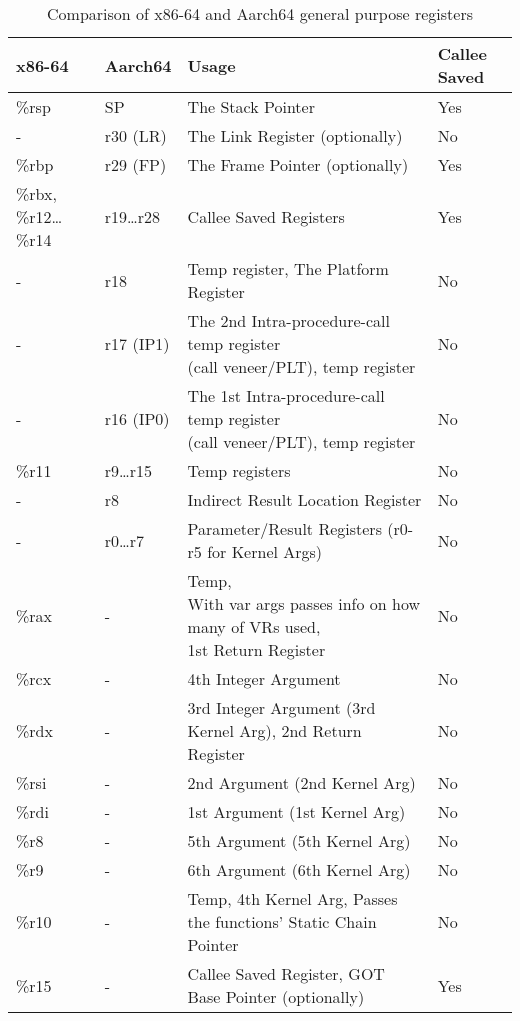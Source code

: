 \documentclass[11pt]{article}
\begin{document}
\begin{table}[ht]
\caption{Comparison of x86-64 and Aarch64 general purpose registers}
\begin{adjustwidth}{-4cm}{-4cm}
\begin{tabular}{|l|l|l|l|}
    \hline
    \textbf{x86-64} & \textbf{Aarch64} & \textbf{Usage} & \textbf{Callee Saved} \\
    \hline
    \%rsp & SP & The Stack Pointer & Yes \\
    \hline
    - & r30 (LR) & The Link Register (optionally) & No \\
    \hline
    \%rbp & r29 (FP) & The Frame Pointer (optionally) & Yes \\
    \hline
    \%rbx, \%r12\ldots \%r14 & r19\ldots r28 & Callee Saved Registers & Yes \\
    \hline
    - & r18 & Temp register, The Platform Register & No \\
    \hline
    - & r17 (IP1) & \pbox{20cm}{The 2nd Intra-procedure-call temp register \\ (call veneer/PLT), temp register} & No \\
    \hline
    - & r16 (IP0) & \pbox{20cm}{The 1st Intra-procedure-call temp register \\ (call veneer/PLT), temp register} & No \\
    \hline
    \%r11 & r9\ldots r15 & Temp registers & No \\
    \hline
    - & r8 & Indirect Result Location Register & No \\
    \hline
    - & r0\ldots r7 & Parameter/Result Registers (r0-r5 for Kernel Args) & No \\
    \hline
    \%rax & - & \pbox{20cm}{Temp, \\  With var args passes info on how many of VRs used, \\ 1st Return Register} & No \\
    \hline
    \%rcx & - & 4th Integer Argument & No \\
    \hline
    \%rdx & - & 3rd Integer Argument (3rd Kernel Arg), 2nd Return Register & No \\
    \hline
    \%rsi & - & 2nd Argument  (2nd Kernel Arg)& No \\
    \hline
    \%rdi & - & 1st Argument (1st Kernel Arg) & No \\
    \hline
    \%r8 & - & 5th Argument (5th Kernel Arg) & No \\
    \hline
    \%r9 & - & 6th Argument (6th Kernel Arg) & No \\
    \hline
    \%r10 & - & Temp, 4th Kernel Arg, Passes the functions' Static Chain Pointer & No \\
    \hline
    \%r15 & - & Callee Saved Register, GOT Base Pointer (optionally) & Yes \\
    \hline
\end{tabular}
\end{adjustwidth}\label{tab:comparison}
\end{table}
\end{document}
